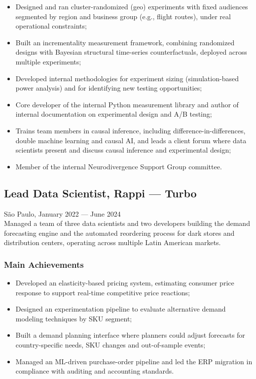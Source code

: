 \documentclass{article}
\newcommand{\jobdate}[3]{
\large
\vspace{0.05em}
  {#1, #2 --- #3}
\vspace{0.5em}
\\
}
\begin{document}
\begin{itemize}
\item{Designed and ran cluster-randomized (geo) experiments with fixed audiences segmented by region and business group (e.g., flight routes), under real operational constraints;}
\item{Built an incrementality measurement framework, combining randomized designs with Bayesian structural time-series counterfactuals, deployed across multiple experiments;}
\item{Developed internal methodologies for experiment sizing (simulation-based power analysis) and for identifying new testing opportunities;}
\item{Core developer of the internal Python measurement library and author of internal documentation on experimental design and A/B testing;}
\item{Trains team members in causal inference, including difference-in-differences, double machine learning and causal AI, and leads a client forum where data scientists present and discuss causal inference and experimental design;}
\item{Member of the internal Neurodivergence Support Group committee.}
\end{itemize}

\subsection{Lead Data Scientist, Rappi --- Turbo}
\jobdate{São Paulo}{January 2022}{June 2024}
Managed a team of three data scientists and two developers building the demand forecasting engine and the automated reordering process for dark stores and distribution centers, operating across multiple Latin American markets.
\subsubsection{Main Achievements}

\begin{itemize}
\item{Developed an elasticity-based pricing system, estimating consumer price response to support real-time competitive price reactions;}
\item{Designed an experimentation pipeline to evaluate alternative demand modeling techniques by SKU segment;}
\item{Built a demand planning interface where planners could adjust forecasts for country-specific needs, SKU changes and out-of-sample events;}
\item{Managed an ML-driven purchase-order pipeline and led the ERP migration in compliance with auditing and accounting standards.}
\end{itemize}
\end{document}
